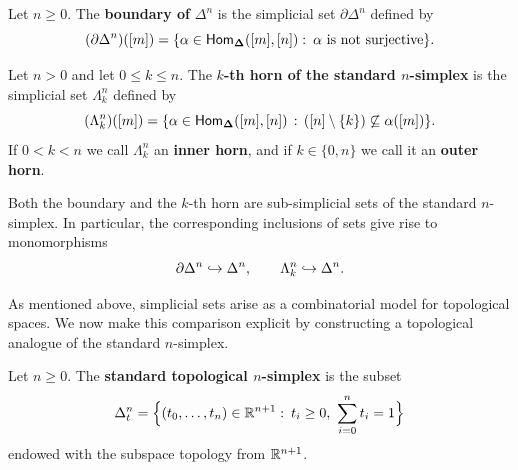 \begin{definition}\label{ch2:: def: boundary n-simplex}
    Let $n\geq 0$. The \textbf{boundary of} $\Delta^{n}$ is the simplicial set $\partial \Delta^{n}$ defined by
    \begin{equation}
        (\partial \Delta^n)([m]) = \{\alpha \in \operatorname{\sf Hom}_{\mathbf\Delta}([m],[n])\,\colon\, \alpha \text{ is not surjective}\}.
    \end{equation}
\end{definition}

\begin{definition}\label{ch2:: def: k-horn}
    Let $n > 0$ and let $0\leq k \leq n$. The \textbf{$k$-th horn of the standard $n$-simplex} is the simplicial set $\Lambda_{k}^{n}$ defined by
    \begin{equation}
        (\Lambda_{k}^{n})([m]) = \{\alpha\in \operatorname{\sf Hom}_{\mathbf\Delta}([m],[n])\, : \, ([n]\setminus \{k\}) \not\subseteq \alpha([m])\}.
    \end{equation} 
    If $0<k<n$ we call $\Lambda_k^n$ an \textbf{inner horn}, and if $k\in \{0,n\}$ we call it an \textbf{outer horn}. 
\end{definition}

Both the boundary and the $k$-th horn are sub-simplicial sets of the standard $n$-simplex. In particular, the corresponding inclusions of sets give rise to monomorphisms
\begin{equation}
    \partial \Delta^n \hookrightarrow \Delta^n,
    \qquad
    \Lambda^{n}_k \hookrightarrow \Delta^n.
\end{equation}

As mentioned above, simplicial sets arise as a combinatorial model for topological spaces. We now make this comparison explicit by constructing a topological analogue of the standard $n$-simplex.

\begin{definition}\label{ch2:: def: topological n-simplex}
    Let $n\geq 0$. The \textbf{standard topological $n$-simplex} is the subset
    \begin{equation}
        \Delta^n_{t} = \Big\{(t_0,\ldots,t_n)\in \RR^{n+1}\,\maps \, t_{i} \geq 0,\ \sum_{i=0}^n t_i = 1\Big\}
    \end{equation}
    endowed with the subspace topology from $\mathbb R^{n+1}$.
\end{definition}

